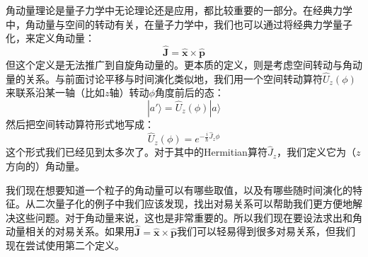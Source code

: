 \documentclass{ctexart}
\begin{document}
角动量理论是量子力学中无论理论还是应用，都比较重要的一部分。在经典力学中，角动量与空间的转动有关，在量子力学中，我们也可以通过将经典力学量子化，来定义角动量：
\begin{equation}
\hat{\bm{J}}=\hat{\bm{x}}\times\hat{\bm{p}}
\end{equation}
但这个定义是无法推广到自旋角动量的。更本质的定义，则是考虑空间转动与角动量的关系。与前面讨论平移与时间演化类似地，我们用一个空间转动算符$\hat{U}_z(\phi)$来联系沿某一轴（比如$z$轴）转动$\phi$角度前后的态：
\begin{equation}
|a'\rangle=\hat{U}_z(\phi)|a\rangle
\end{equation}
然后把空间转动算符形式地写成：
\begin{equation}
\hat{U}_z(\phi)=e^{-\frac{i}{\hbar}\hat{J}_z\phi}
\end{equation}
这个形式我们已经见到太多次了。对于其中的Hermitian算符$\hat{J}_z$，我们定义它为（$z$方向的）角动量。

我们现在想要知道一个粒子的角动量可以有哪些取值，以及有哪些随时间演化的特征。从二次量子化的例子中我们应该发现，找出对易关系可以帮助我们更方便地解决这些问题。对于角动量来说，这也是非常重要的。所以我们现在要设法求出和角动量相关的对易关系。如果用$\hat{\bm{J}}=\hat{\bm{x}}\times\hat{\bm{p}}$我们可以轻易得到很多对易关系，但我们现在尝试使用第二个定义。
\end{document}
